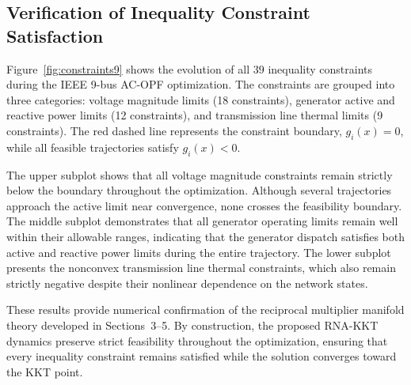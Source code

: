 \documentclass[11pt,onecolumn]{article}
\theoremstyle{definition}
\theoremstyle{remark}
\begin{document}
\subsection{Verification of Inequality Constraint Satisfaction}

Figure~\ref{fig:constraints9} shows the evolution of all $39$ inequality
constraints during the IEEE 9-bus AC-OPF optimization. The constraints are
grouped into three categories: voltage magnitude limits (18 constraints),
generator active and reactive power limits (12 constraints), and transmission
line thermal limits (9 constraints). The red dashed line represents the
constraint boundary, $g_i(x)=0$, while all feasible trajectories satisfy
$g_i(x)<0$.

The upper subplot shows that all voltage magnitude constraints remain strictly
below the boundary throughout the optimization. Although several trajectories
approach the active limit near convergence, none crosses the feasibility
boundary. The middle subplot demonstrates that all generator operating limits
remain well within their allowable ranges, indicating that the generator
dispatch satisfies both active and reactive power limits during the entire
trajectory. The lower subplot presents the nonconvex transmission line thermal
constraints, which also remain strictly negative despite their nonlinear
dependence on the network states.

These results provide numerical confirmation of the reciprocal multiplier
manifold theory developed in Sections~3--5. By construction, the proposed
RNA-KKT dynamics preserve strict feasibility throughout the optimization,
ensuring that every inequality constraint remains satisfied while the solution
converges toward the KKT point.
\end{document}
